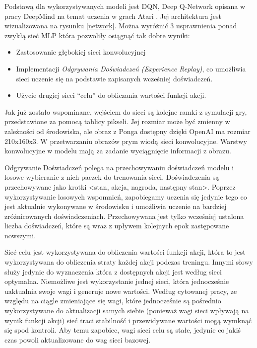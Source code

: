 \documentclass[preprint,12pt]{elsarticle}
\begin{document}
Podstawą dla wykorzystywanych modeli jest DQN, Deep Q-Network opisana w pracy DeepMind na temat uczenia w grach Atari \cite{DeepMind:2015}. Jej architektura jest wizualizowana na rysunku \ref{network}. Można wyróżnić 3 usprawnienia ponad zwykłą sieć MLP która pozwoliły osiągnąć tak dobre wyniki:

\begin{itemize}
\item {Zastosowanie głębokiej sieci konwolucyjnej}
\item {Implementacji \textit{Odgrywania Doświadczeń (Experience Replay)}, co umożliwia sieci uczenie się na podstawie zapisanych wcześniej doświadczeń.}
\item {Użycie drugiej sieci ``celu'' do obliczania wartości funkcji akcji.}
\end{itemize}

Jak już zostało wspominane, wejściem do sieci są kolejne ramki z symulacji gry, przedstawione za pomocą tablicy pikseli. Jej rozmiar może być zmienny w zależności od środowiska, ale obraz z Ponga dostępny dzięki OpenAI ma rozmiar 210x160x3. W przetwarzaniu obrazów prym wiodą sieci konwolucyjne. Warstwy konwolucyjne w modelu mają za zadanie wyciągnięcie informacji z obrazu. 

Odgrywanie Doświadczeń polega na przechowywaniu doświadczeń modelu i losowe wybieranie z nich paczek do trenowania sieci. Doświadczenia są przechowywane jako krotki \textless stan, akcja, nagroda, następny stan\textgreater. Poprzez wykorzystywanie losowych wspomnień, zapobiegamy uczenia się jedynie tego co jest aktualnie wykonywane w środowisku i umożliwia uczenie na bardziej zróżnicowanych doświadczeniach. Przechowywana jest tylko wcześniej ustalona liczba doświadczeń, które są wraz z upływem kolejnych epok zastępowane nowszymi.

Sieć celu jest wykorzystywana do obliczenia wartości funkcji akcji, która to jest wykorzystywana do obliczenia straty każdej akcji podczas treningu. Innymi słowy służy jedynie do wyznaczenia która z dostępnych akcji jest według sieci optymalna. Niemożliwe jest wykorzystanie jednej sieci, która jednocześnie uaktualnia swoje wagi i generuje nowe wartości. Według cytowanej pracy, ze względu na ciągle zmieniające się wagi, które jednocześnie są pośrednio wykorzystywane do aktualizacji samych siebie (ponieważ wagi sieci wpływają na wynik funkcji akcji) sieć traci stabilność i przewidywane wartości mogą wymknąć się spod kontroli. Aby temu zapobiec, wagi sieci celu są stałe, jedynie co jakiś czas powoli aktualizowane do wag sieci bazowej.
\end{document}
